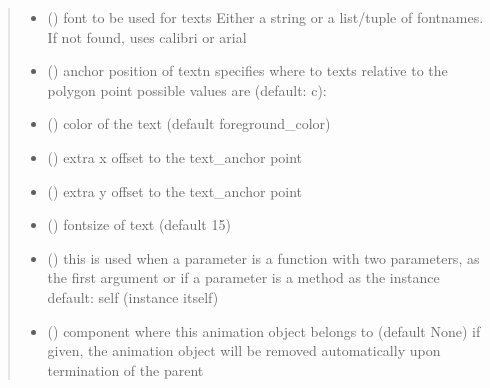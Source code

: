 \documentclass[letterpaper,10pt,english]{sphinxmanual}
\begin{document}
\begin{fulllineitems}
\begin{quote}
\begin{description}
\begin{itemize}
\item {} 
 () \textendash{} font to be used for texts 
Either a string or a list/tuple of fontnames.
If not found, uses calibri or arial

\item {} 
 () \textendash{} anchor position of text\textbar{}n\textbar{}
specifies where to texts relative to the polygon
point 
possible values are (default: c): 

\item {} 
 () \textendash{} color of the text (default foreground\_color)

\item {} 
 () \textendash{} extra x offset to the text\_anchor point

\item {} 
 () \textendash{} extra y offset to the text\_anchor point

\item {} 
 () \textendash{} fontsize of text (default 15)

\item {} 
 () \textendash{} this is used when a parameter is a function with two parameters, as the first argument or
if a parameter is a method as the instance 
default: self (instance itself)

\item {} 
 ({\hyperref[\detokenize{Reference:salabim.Component}]{}}) \textendash{} component where this animation object belongs to (default None) 
if given, the animation object will be removed
automatically upon termination of the parent

\end{itemize}

\end{description}\end{quote}


\end{fulllineitems}
\end{document}
